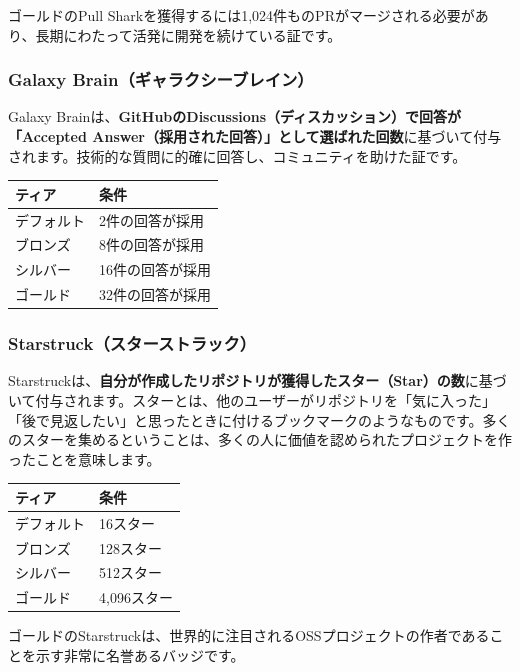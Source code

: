 ゴールドのPull Sharkを獲得するには1,024件ものPRがマージされる必要があり、長期にわたって活発に開発を続けている証です。

\subsubsection{Galaxy Brain（ギャラクシーブレイン）}

Galaxy Brainは、\textbf{GitHubのDiscussions（ディスカッション）で回答が「Accepted Answer（採用された回答）」として選ばれた回数}に基づいて付与されます。技術的な質問に的確に回答し、コミュニティを助けた証です。

\begin{table}[htbp]
\centering
\begin{tabular}{ll}
\hline
\textbf{ティア} & \textbf{条件} \\
\hline
デフォルト & 2件の回答が採用 \\
ブロンズ & 8件の回答が採用 \\
シルバー & 16件の回答が採用 \\
ゴールド & 32件の回答が採用 \\
\hline
\end{tabular}
\end{table}

\subsubsection{Starstruck（スターストラック）}

Starstruckは、\textbf{自分が作成したリポジトリが獲得したスター（Star）の数}に基づいて付与されます。スターとは、他のユーザーがリポジトリを「気に入った」「後で見返したい」と思ったときに付けるブックマークのようなものです。多くのスターを集めるということは、多くの人に価値を認められたプロジェクトを作ったことを意味します。

\begin{table}[htbp]
\centering
\begin{tabular}{ll}
\hline
\textbf{ティア} & \textbf{条件} \\
\hline
デフォルト & 16スター \\
ブロンズ & 128スター \\
シルバー & 512スター \\
ゴールド & 4,096スター \\
\hline
\end{tabular}
\end{table}

ゴールドのStarstruckは、世界的に注目されるOSSプロジェクトの作者であることを示す非常に名誉あるバッジです。

